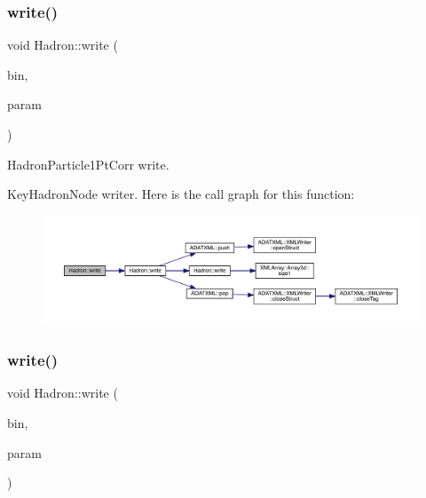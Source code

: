 \subsubsection{\texorpdfstring{write()}{write()}\hspace{0.1cm}{\footnotesize\ttfamily [81/95]}}
{\footnotesize\ttfamily void Hadron\+::write (\begin{DoxyParamCaption}\item[{\mbox{\hyperlink{classADATIO_1_1BinaryWriter}{Binary\+Writer}} \&}]{bin,  }\item[{const \mbox{\hyperlink{structHadron_1_1KeyHadronNode__t}{Key\+Hadron\+Node\+\_\+t}} \&}]{param }\end{DoxyParamCaption})}



Hadron\+Particle1\+Pt\+Corr write. 

Key\+Hadron\+Node writer. Here is the call graph for this function\+:\nopagebreak
\begin{figure}[H]
\begin{center}
\leavevmode
\includegraphics[width=350pt]{d1/daf/namespaceHadron_a33192b7d206ee95549b4605c3db6cde8_cgraph}
\end{center}
\end{figure}
\mbox{\label{namespaceHadron_aa05ac649ec39cb98483ab55274129758}} 
\subsubsection{\texorpdfstring{write()}{write()}\hspace{0.1cm}{\footnotesize\ttfamily [82/95]}}
{\footnotesize\ttfamily void Hadron\+::write (\begin{DoxyParamCaption}\item[{\mbox{\hyperlink{classADATIO_1_1BinaryWriter}{Binary\+Writer}} \&}]{bin,  }\item[{const \mbox{\hyperlink{structHadron_1_1KeyHadronNPartIrrepOp__t_1_1CGPair__t}{Key\+Hadron\+N\+Part\+Irrep\+Op\+\_\+t\+::\+C\+G\+Pair\+\_\+t}} \&}]{param }\end{DoxyParamCaption})}

